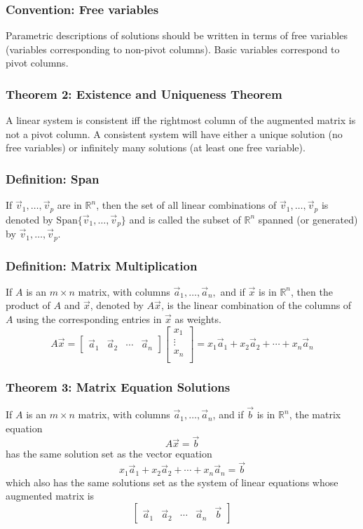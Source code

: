 \documentclass{article}
\begin{document}
\subsubsection*{Convention: Free variables}
Parametric descriptions of solutions should be written in terms of free variables (variables corresponding to non-pivot columns). Basic variables correspond to pivot columns. 
\subsubsection*{Theorem 2: Existence and Uniqueness Theorem}
A linear system is consistent iff the rightmost column of the augmented matrix is not a pivot column. A consistent system will have either a unique solution (no free variables) or infinitely many solutions (at least one free variable).
\subsubsection*{Definition: Span}
If $\vec v_1, \dots, \vec v_p$ are in $\mathbb{R}^n$, then the set of all linear combinations of $\vec v_1, \dots, \vec v_p$ is denoted by $\text{Span} \{\vec v_1, \dots, \vec v_p \}$ and is called the subset of $\mathbb{R}^n$ spanned (or generated) by $\vec v_1, \dots, \vec v_p$.
\subsubsection*{Definition: Matrix Multiplication}
If $A$ is an $m \times n$ matrix, with columns $\vec a_1, \dots, \vec a_n,$ and if $\vec x$ is in $\mathbb{R} ^n$, then the product of $A$ and $\vec x$, denoted by $A\vec x$, is the linear combination of the columns of $A$ using the corresponding entries in $\vec x$ as weights. 
$$A \vec x = \begin{bmatrix}
    \vec a_1 & \vec a_2 & \cdots & \vec a_n
\end{bmatrix}
\begin{bmatrix}
    x_1 \\
    \vdots \\
    x_n \\
\end{bmatrix}
= x_1 \vec a_1 + x_2 \vec a_2 + \cdots + x_n \vec a_n$$

\subsubsection*{Theorem 3: Matrix Equation Solutions}
If $A$ is an $m \times n$ matrix, with columns $\vec a_1, \dots, \vec a_n$, and if $\vec b$ is in $\mathbb{R}^n$, the matrix equation 
$$A \vec x = \vec b$$
has the same solution set as the vector equation 
$$x_1 \vec a_1 + x_2 \vec a_2 + \cdots + x_n \vec a_n = \vec b$$
which also has the same solutions set as the system of linear equations whose augmented matrix is
$$\begin{bmatrix}
    \vec a_1 & \vec a_2 & \cdots & \vec a_n & \vec b 
\end{bmatrix}$$
\end{document}
